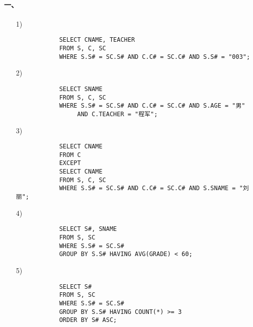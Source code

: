 \documentclass[10pt,a4paper]{article}
\begin{document}
	\pagestyle{main}    %
	
	\setlength{\parskip}{0pt}
	\renewcommand{\baselinestretch}{1.5}
	
    \paragraph{一、}
    \begin{enumerate}
        \item[1)] 
        \begin{verbatim}
            SELECT CNAME, TEACHER
            FROM S, C, SC
            WHERE S.S# = SC.S# AND C.C# = SC.C# AND S.S# = "003";
        \end{verbatim}
        \item[2)]\begin{verbatim}
            SELECT SNAME
            FROM S, C, SC
            WHERE S.S# = SC.S# AND C.C# = SC.C# AND S.AGE = "男"
                 AND C.TEACHER = "程军";
        \end{verbatim}
        \item[3)]\begin{verbatim}
            SELECT CNAME
            FROM C
            EXCEPT
            SELECT CNAME
            FROM S, C, SC
            WHERE S.S# = SC.S# AND C.C# = SC.C# AND S.SNAME = "刘丽";
        \end{verbatim}
        \item[4)]\begin{verbatim}
            SELECT S#, SNAME
            FROM S, SC
            WHERE S.S# = SC.S#
            GROUP BY S.S# HAVING AVG(GRADE) < 60;
        \end{verbatim}
        \item[5)]\begin{verbatim}
            SELECT S#
            FROM S, SC
            WHERE S.S# = SC.S#
            GROUP BY S.S# HAVING COUNT(*) >= 3
            ORDER BY S# ASC;
        \end{verbatim}
    \end{enumerate}
    
\end{document}
